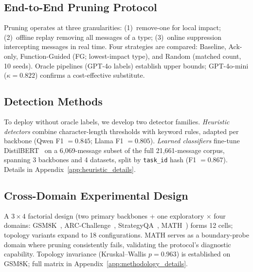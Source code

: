 \subsection{End-to-End Pruning Protocol}
\label{sec:pruning_protocol}

Pruning operates at three granularities: (1)~remove-one for local impact; (2)~offline replay removing all messages of a type; (3)~online suppression intercepting messages in real time. Four strategies are compared: Baseline, Ack-only, Function-Guided (FG; lowest-impact type), and Random (matched count, 10 seeds). Oracle pipelines (GPT-4o labels) establish upper bounds; GPT-4o-mini ($\kappa = 0.822$) confirms a cost-effective substitute.

\subsection{Detection Methods}
\label{sec:heuristic}
\label{sec:learned_classifier}

To deploy without oracle labels, we develop two detector families. \emph{Heuristic detectors} combine character-length thresholds with keyword rules, adapted per backbone (Qwen F1 $= 0.845$; Llama F1 $= 0.805$). \emph{Learned classifiers} fine-tune DistilBERT~\citep{sanh_distilbert_2019} on a 6{,}069-message subset of the full 21{,}661-message corpus, spanning 3 backbones and 4 datasets, split by \texttt{task\_id} hash (F1 $= 0.867$). Details in Appendix~\ref{app:heuristic_details}.

\subsection{Cross-Domain Experimental Design}
\label{sec:cross_domain_design}

A $3 \times 4$ factorial design (two primary backbones + one exploratory $\times$ four domains: GSM8K~\citep{cobbe_gsm8k_2021}, ARC-Challenge~\citep{clark_arc_2018}, StrategyQA~\citep{geva_strategyqa_2021}, MATH~\citep{hendrycks_math_2021}) forms 12 cells; topology variants expand to 18 configurations. MATH serves as a boundary-probe domain where pruning consistently fails, validating the protocol's diagnostic capability. Topology invariance (Kruskal--Wallis $p = 0.963$) is established on GSM8K; full matrix in Appendix~\ref{app:methodology_details}.

